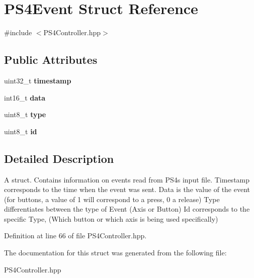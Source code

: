 \hypertarget{struct_p_s4_event}{}\section{P\+S4\+Event Struct Reference}
\label{struct_p_s4_event}


{\ttfamily \#include $<$P\+S4\+Controller.\+hpp$>$}

\subsection*{Public Attributes}
\begin{DoxyCompactItemize}
\item 
\mbox{\label{struct_p_s4_event_ac1a4943f272199fc8fb2b39b8870ad27}} 
uint32\+\_\+t {\bfseries timestamp}
\item 
\mbox{\label{struct_p_s4_event_a45d7af83b97c1b3562de34e412769b82}} 
int16\+\_\+t {\bfseries data}
\item 
\mbox{\label{struct_p_s4_event_a9b861b1575bdfc248c881a795e4af81a}} 
uint8\+\_\+t {\bfseries type}
\item 
\mbox{\label{struct_p_s4_event_af2c0d06bcc928d9449a80c42ef502c08}} 
uint8\+\_\+t {\bfseries id}
\end{DoxyCompactItemize}


\subsection{Detailed Description}
A struct. Contains information on events read from P\+S4\textquotesingle{}s input file. Timestamp corresponds to the time when the event was sent. Data is the value of the event (for buttons, a value of 1 will correspond to a press, 0 a release) Type differentiates between the type of Event (Axis or Button) Id corresponds to the specific Type, (Which button or which axis is being used specifically) 

Definition at line 66 of file P\+S4\+Controller.\+hpp.



The documentation for this struct was generated from the following file\+:\begin{DoxyCompactItemize}
\item 
P\+S4\+Controller.\+hpp\end{DoxyCompactItemize}
